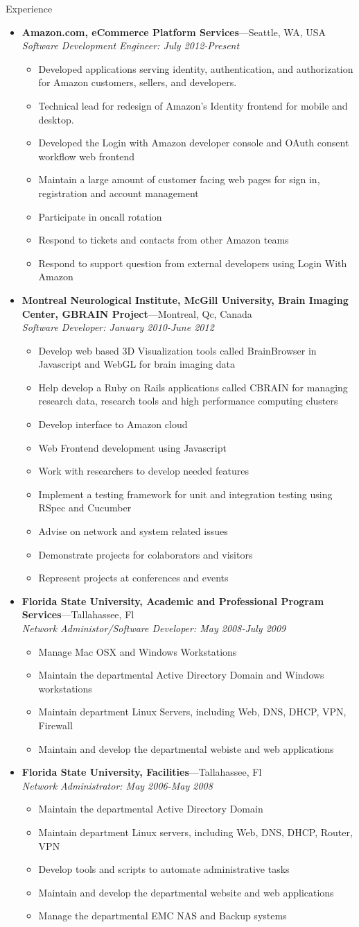 \documentclass[11pt,oneside]{article}
\newenvironment{ressection}[1]{
  \vspace{4pt}
	 {\fontfamily{phv}\selectfont\Large#1}
	 \begin{itemize}
	   \vspace{3pt}
}{
	 \end{itemize}
}
\newcommand{\ressubitem}[1]{
  \vspace{-1pt}
\item \begin{flushleft} #1 \end{flushleft}
}
\newcommand{\resbigitem}[3]{
  \vspace{-5pt}
\item
  \textbf{#1}---#2 \\
  \textit{#3}
}
\newenvironment{ressubsec}[3]{
  \resbigitem{#1}{#2}{#3}
  \vspace{-2pt}
  \begin{itemize}
}{
  \end{itemize}
}
\begin{document}
\begin{ressection}{Experience}
  \begin{ressubsec}{Amazon.com, eCommerce Platform Services}{Seattle, WA, USA}{Software Development Engineer: July 2012-Present}  
    \ressubitem {Developed applications serving identity, authentication, and authorization for Amazon customers, sellers, and developers.}
    \ressubitem {Technical lead for redesign of Amazon's Identity frontend for mobile and desktop.}
    \ressubitem {Developed the Login with Amazon developer console and OAuth consent workflow web frontend}
    \ressubitem {Maintain a large amount of customer facing web pages for sign in, registration and account management}
    \ressubitem {Participate in oncall rotation}
    \ressubitem {Respond to tickets and contacts from other Amazon teams}
    \ressubitem {Respond to support question from external developers using Login With Amazon}
  \end{ressubsec}
  \begin{ressubsec}{Montreal Neurological Institute, McGill University, Brain Imaging Center, GBRAIN Project}{Montreal, Qc, Canada}{Software Developer: January 2010-June 2012}
    \ressubitem {Develop web based 3D Visualization tools called BrainBrowser in Javascript and WebGL for brain imaging data}
    \ressubitem {Help develop a  Ruby on Rails applications called CBRAIN for managing research data, research tools and high performance computing clusters}
    \ressubitem {Develop interface to Amazon cloud}
    \ressubitem {Web Frontend development using Javascript} 
    \ressubitem {Work with researchers to develop needed features}
    \ressubitem {Implement a testing framework for unit and integration testing using RSpec and Cucumber}
    \ressubitem {Advise on network and system related issues}
    \ressubitem {Demonstrate projects for colaborators and visitors}
    \ressubitem {Represent projects at conferences and events}
  \end{ressubsec}
  \begin{ressubsec}{Florida State University, Academic and Professional Program Services}{Tallahassee, Fl}{Network Administor/Software Developer: May 2008-July 2009}
    \ressubitem{Manage Mac OSX and Windows Workstations}
    \ressubitem{Maintain the departmental Active Directory Domain and Windows workstations}
    \ressubitem{Maintain department Linux Servers, including Web, DNS, DHCP, VPN, Firewall}
    \ressubitem{Maintain and develop the departmental webiste and web applications}
  \end{ressubsec}
  \begin{ressubsec}{Florida State University, Facilities}{Tallahassee, Fl}
    {Network Administrator: May 2006-May 2008}
    \ressubitem{Maintain the departmental Active Directory Domain}
    \ressubitem{Maintain department Linux servers, including Web, DNS, DHCP, Router, VPN}
    \ressubitem{Develop tools and scripts to automate administrative tasks}
    \ressubitem{Maintain and develop the departmental website and web applications}
    \ressubitem{Manage the departmental EMC NAS and Backup systems}
  \end{ressubsec}
\end{ressection}
\end{document}
